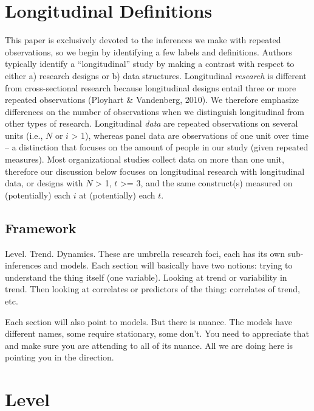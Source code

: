 \documentclass[english,,man]{apa6}
\theoremstyle{definition}
\theoremstyle{definition}
\theoremstyle{definition}
\theoremstyle{remark}
\begin{document}
\hypertarget{longitudinal-definitions}{%
\section{Longitudinal Definitions}\label{longitudinal-definitions}}

This paper is exclusively devoted to the inferences we make with
repeated observations, so we begin by identifying a few labels and
definitions. Authors typically identify a \enquote{longitudinal} study
by making a contrast with respect to either a) research designs or b)
data structures. Longitudinal \emph{research} is different from
cross-sectional research because longitudinal designs entail three or
more repeated observations (Ployhart \& Vandenberg, 2010). We therefore
emphasize differences on the number of observations when we distinguish
longitudinal from other types of research. Longitudinal \emph{data} are
repeated observations on several units (i.e., \(N\) or \(i\)
\textgreater{} 1), whereas panel data are observations of one unit over
time -- a distinction that focuses on the amount of people in our study
(given repeated measures). Most organizational studies collect data on
more than one unit, therefore our discussion below focuses on
longitudinal research with longitudinal data, or designs with \(N\)
\textgreater{} 1, \(t\) \textgreater{}= 3, and the same construct(s)
measured on (potentially) each \(i\) at (potentially) each \(t\).

\hypertarget{framework}{%
\subsection{Framework}\label{framework}}

Level. Trend. Dynamics. These are umbrella research foci, each has its
own sub-inferences and models. Each section will basically have two
notions: trying to understand the thing itself (one variable). Looking
at trend or variability in trend. Then looking at correlates or
predictors of the thing: correlates of trend, etc.

Each section will also point to models. But there is nuance. The models
have different names, some require stationary, some don't. You need to
appreciate that and make sure you are attending to all of its nuance.
All we are doing here is pointing you in the direction.

\hypertarget{level}{%
\section{Level}\label{level}}
\end{document}
